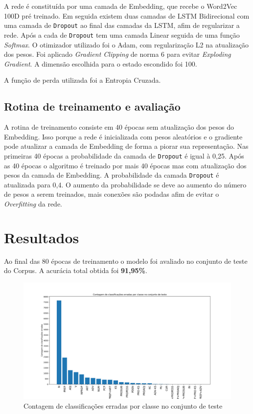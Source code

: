 \documentclass[11pt]{scrartcl} %
\begin{document}
A rede é constituída por uma camada de Embedding, que recebe o Word2Vec 100D pré treinado. Em seguida existem duas camadas de LSTM Bidirecional com uma camada de \texttt{Dropout} ao final das camadas da LSTM, afim de regularizar a rede. Após a cada de \texttt{Dropout} tem uma camada Linear seguida de uma função \textit{Softmax}. O otimizador utilizado foi o Adam, com regularização L2 na atualização dos pesos. Foi aplicado \textit{Gradient Clipping} de norma 6 para evitar \textit{Exploding Gradient}. A dimensão escolhida para o estado escondido foi 100. 

A função de perda utilizada foi a Entropia Cruzada.

\subsection{Rotina de treinamento e avaliação}

A rotina de treinamento consiste em 40 épocas sem atualização dos pesos do Embedding. Isso porque a rede é inicializada com pesos aleatórios e o gradiente pode atualizar a camada de Embedding de forma a piorar sua representação. Nas primeiras 40 épocas a probabilidade da camada de \texttt{Dropout} é igual à 0,25. Após as 40 épocas o algoritmo é treinado por mais 40 épocas mas com atualização dos pesos da camada de Embedding. A probabilidade da camada \texttt{Dropout} é atualizada para 0,4. O aumento da probabilidade se deve ao aumento do número de pesos a serem treinados, mais conexões são podadas afim de evitar o \textit{Overfitting} da rede.


\section{Resultados}

Ao final das 80 épocas de treinamento o modelo foi avaliado no conjunto de teste do Corpus. A acurácia total obtida foi \textbf{91,95\%}.


\begin{figure}[H] %
	\centering
	\includegraphics[width=1\columnwidth]{./Figures/contagem_class.png} %
	\caption{Contagem de classificações erradas por classe no conjunto de teste}
	\label{fig:contagem}
\end{figure}
\end{document}

